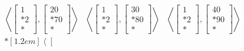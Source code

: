 \documentclass{article}
\begin{document}
\begin{equation}
\begin{aligned}
\begin{matrix}
                        \left<
                            \left[
                                \begin{matrix}
                                    1 \\* 2 \\*
                                \end{matrix}
                            \right],
                            \left[
                                \begin{matrix}
                                    20 \\* 70 \\*
                                \end{matrix}
                            \right]
                        \right>
                    &
                        \left<
                            \left[
                                \begin{matrix}
                                    1 \\* 2 \\*
                                \end{matrix}
                            \right],
                            \left[
                                \begin{matrix}
                                    30 \\* 80 \\*
                                \end{matrix}
                            \right]
                        \right>
                    &
                        \left<
                            \left[
                                \begin{matrix}
                                    1 \\* 2 \\*
                                \end{matrix}
                            \right],
                            \left[
                                \begin{matrix}
                                    40 \\* 90 \\*
                                \end{matrix}
                            \right]
                        \right>
                \\*[1.2em]
                        \left<
                            \left[

\end{matrix}
\end{aligned}
\end{equation}
\end{document}
